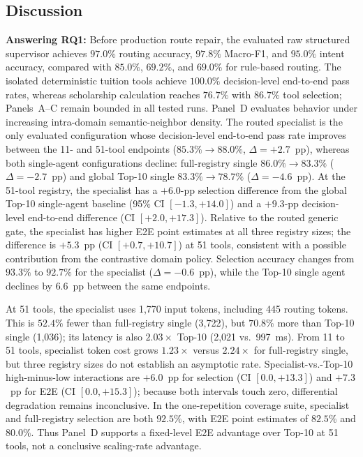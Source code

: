 \subsection{Discussion}
\label{sec:discussion}

\textbf{Answering RQ1:} Before production route repair, the evaluated raw structured supervisor achieves $97.0\%$ routing accuracy, $97.8\%$ Macro-F1, and $95.0\%$ intent accuracy, compared with $85.0\%$, $69.2\%$, and $69.0\%$ for rule-based routing. The isolated deterministic tuition tools achieve $100.0\%$ decision-level end-to-end pass rates, whereas scholarship calculation reaches $76.7\%$ with $86.7\%$ tool selection; Panels~A--C remain bounded in all tested runs. Panel~D evaluates behavior under increasing intra-domain semantic-neighbor density. The routed specialist is the only evaluated configuration whose decision-level end-to-end pass rate improves between the 11- and 51-tool endpoints ($85.3\% \rightarrow 88.0\%$, $\Delta=+2.7$~pp), whereas both single-agent configurations decline: full-registry single $86.0\% \rightarrow 83.3\%$ ($\Delta=-2.7$~pp) and global Top-10 single $83.3\% \rightarrow 78.7\%$ ($\Delta=-4.6$~pp). At the 51-tool registry, the specialist has a $+6.0$-pp selection difference from the global Top-10 single-agent baseline (95\% CI $[-1.3,+14.0]$) and a $+9.3$-pp decision-level end-to-end difference (CI $[+2.0,+17.3]$). Relative to the routed generic gate, the specialist has higher E2E point estimates at all three registry sizes; the difference is $+5.3$~pp (CI $[+0.7,+10.7]$) at 51 tools, consistent with a possible contribution from the contrastive domain policy. Selection accuracy changes from $93.3\%$ to $92.7\%$ for the specialist ($\Delta=-0.6$~pp), while the Top-10 single agent declines by $6.6$~pp between the same endpoints.

At 51 tools, the specialist uses 1,770 input tokens, including 445 routing tokens. This is $52.4\%$ fewer than full-registry single (3,722), but $70.8\%$ more than Top-10 single (1,036); its latency is also $2.03\times$ Top-10 (2,021 vs.\ 997~ms). From 11 to 51 tools, specialist token cost grows $1.23\times$ versus $2.24\times$ for full-registry single, but three registry sizes do not establish an asymptotic rate. Specialist-vs.-Top-10 high-minus-low interactions are $+6.0$~pp for selection (CI $[0.0,+13.3]$) and $+7.3$~pp for E2E (CI $[0.0,+15.3]$); because both intervals touch zero, differential degradation remains inconclusive. In the one-repetition coverage suite, specialist and full-registry selection are both $92.5\%$, with E2E point estimates of $82.5\%$ and $80.0\%$. Thus Panel~D supports a fixed-level E2E advantage over Top-10 at 51 tools, not a conclusive scaling-rate advantage.

